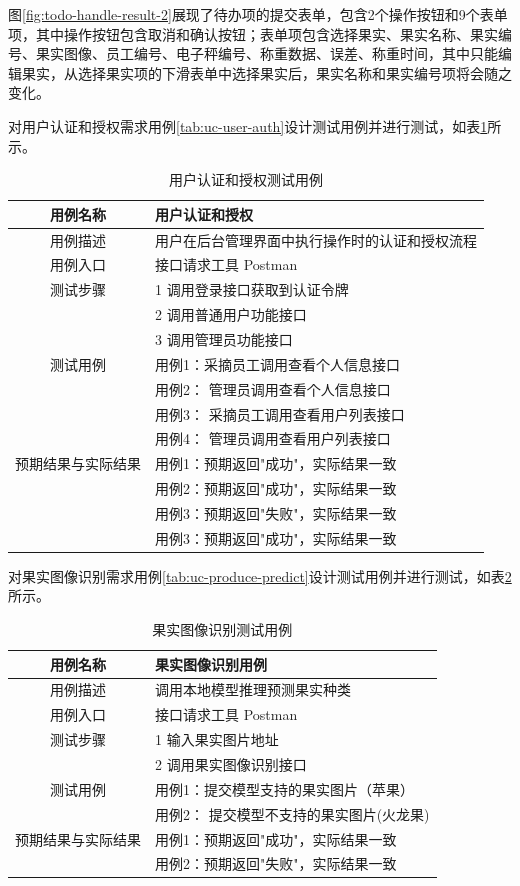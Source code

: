 图\ref{fig:todo-handle-result-2}展现了待办项的提交表单，包含2个操作按钮和9个表单项，其中操作按钮包含取消和确认按钮；表单项包含选择果实、果实名称、果实编号、果实图像、员工编号、电子秤编号、称重数据、误差、称重时间，其中只能编辑果实，从选择果实项的下滑表单中选择果实后，果实名称和果实编号项将会随之变化。

对用户认证和授权需求用例\ref{tab:uc-user-auth}设计测试用例并进行测试，如表\ref{tab:uc-user-auth-test}所示。

\begin{longtable}[ht]{|c|p{8cm}|}
\caption{用户认证和授权测试用例}
\label{tab:uc-user-auth-test}
\\
\hline
用例名称 & 用户认证和授权 \\
\hline
用例描述 & 用户在后台管理界面中执行操作时的认证和授权流程 \\
\hline
用例入口 & 接口请求工具 Postman \\
\hline
测试步骤 & 1 调用登录接口获取到认证令牌 \\
& 2 调用普通用户功能接口 \\
& 3 调用管理员功能接口 \\
\hline
测试用例 & 用例1：采摘员工调用查看个人信息接口 \\
& 用例2： 管理员调用查看个人信息接口 \\
& 用例3： 采摘员工调用查看用户列表接口 \\
& 用例4： 管理员调用查看用户列表接口 \\
\hline
预期结果与实际结果 & 用例1：预期返回"成功"，实际结果一致 \\
& 用例2：预期返回"成功"，实际结果一致 \\
& 用例3：预期返回"失败"，实际结果一致 \\
& 用例3：预期返回"成功"，实际结果一致 \\
\hline
\end{longtable}

对果实图像识别需求用例\ref{tab:uc-produce-predict}设计测试用例并进行测试，如表\ref{tab:uc-produce-predict-test}所示。

\begin{longtable}[ht]{|c|p{8cm}|}
\caption{果实图像识别测试用例}
\label{tab:uc-produce-predict-test}
\\
\hline
用例名称 & 果实图像识别用例 \\
\hline
用例描述 & 调用本地模型推理预测果实种类 \\
\hline
用例入口 & 接口请求工具 Postman \\
\hline
测试步骤 & 1 输入果实图片地址 \\
& 2 调用果实图像识别接口 \\
\hline
测试用例 & 用例1：提交模型支持的果实图片（苹果） \\
& 用例2： 提交模型不支持的果实图片(火龙果) \\
\hline
预期结果与实际结果 & 用例1：预期返回"成功"，实际结果一致 \\
& 用例2：预期返回"失败"，实际结果一致 \\
\hline
\end{longtable}

